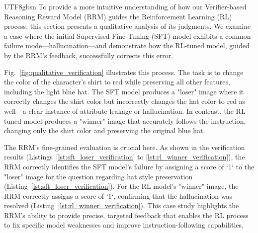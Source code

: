 \documentclass{llmxive}
\begin{document}
\begin{CJK*}{UTF8}{gbsn}
To provide a more intuitive understanding of how our Verifier-based Reasoning Reward Model (RRM) guides the Reinforcement Learning (RL) process, this section presents a qualitative analysis of its judgments. We examine a case where the initial Supervised Fine-Tuning (SFT) model exhibits a common failure mode—hallucination—and demonstrate how the RL-tuned model, guided by the RRM's feedback, successfully corrects this error.

Fig.~\ref{fig:qualitative_verification} illustrates this process. The task is to change the color of the character's shirt to red while preserving all other features, including the light blue hat. The SFT model produces a "loser" image where it correctly changes the shirt color but incorrectly changes the hat color to red as well—a clear instance of attribute leakage or hallucination. In contrast, the RL-tuned model produces a "winner" image that accurately follows the instruction, changing only the shirt color and preserving the original blue hat.

The RRM's fine-grained evaluation is crucial here. As shown in the verification results (Listings~\ref{lst:sft_loser_verification} to \ref{lst:rl_winner_verification}), the RRM correctly identifies the SFT model's failure by assigning a score of `1` to the "loser" image for the question regarding hat style preservation (Listing~\ref{lst:sft_loser_verification}). For the RL model's "winner" image, the RRM correctly assigns a score of `1`, confirming that the hallucination was resolved (Listing~\ref{lst:rl_winner_verification}). This case study highlights the RRM's ability to provide precise, targeted feedback that enables the RL process to fix specific model weaknesses and improve instruction-following capabilities.



\end{CJK*}
\end{document}
